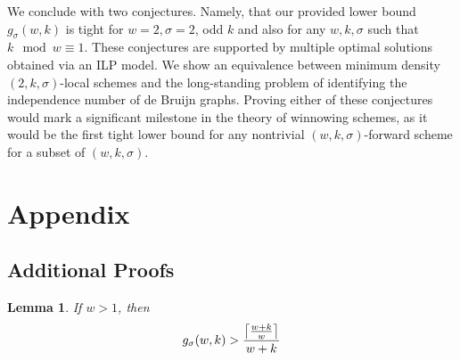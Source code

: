 \documentclass{article}
\newtheorem{lemma}[theorem]{Lemma}
\DeclarePairedDelimiter\ceil{\lceil}{\rceil}
\begin{document}
We conclude with two conjectures. Namely, that our provided lower bound $g_\sigma(w, k)$ is tight for $w=2, \sigma=2$, odd $k$ and also for any $w, k, \sigma$ such that $k\mod w\equiv 1$. These conjectures are supported by multiple optimal solutions obtained via an ILP model. We show an equivalence between minimum density $(2, k, \sigma)$-local schemes and the long-standing problem of identifying the independence number of de Bruijn graphs. Proving either of these conjectures would mark a significant milestone in the theory of winnowing schemes, as it would be the first tight lower bound for any nontrivial $(w,k,\sigma)$-forward scheme for a subset of $(w, k, \sigma)$. 


  

\section{Appendix}


\subsection{Additional Proofs}
\begin{lemma}
If $w>1$, then
$$g_\sigma(w, k) > \frac{\ceil*{\frac{w+k}{w}}}{w+k}$$
\end{lemma}
\end{document}
